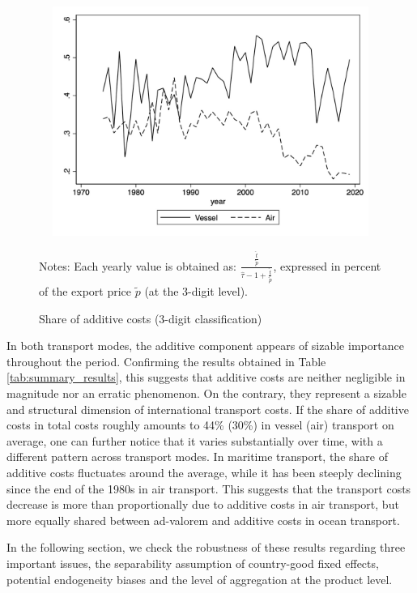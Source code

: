 \documentclass[a4paper,11pt]{article}
\begin{document}
\begin{figure}[htbp]
\caption{Share of additive costs (3-digit classification)}
\label{fig:part_cout_additif}
\begin{center}
 \includegraphics[width=12cm, height=7.5cm]{Figure1_share_of_additive_in_totalTC.jpg}
\begin{minipage} [c]  {5in} \scriptsize%
Notes: Each yearly value is obtained as: $\frac{\frac{\widehat{t}}{\widetilde{p}}}{\widehat{\tau}-1+\frac{\widehat{t}}{\widetilde{p}}}$, expressed in percent of the export price $\widetilde{p}$ (at the 3-digit level).
\end{minipage}
\end{center}
\end{figure}


In both transport modes, the additive component appears of sizable importance throughout the period.
Confirming the results obtained in Table \ref{tab:summary_results}, this suggests that additive costs are neither negligible in magnitude nor an erratic phenomenon.
On the contrary, they represent a sizable and structural dimension of international transport costs.
If the share of additive costs in total costs roughly amounts to 44\% (30\%) in vessel (air) transport on average, one can further notice that it varies substantially over time, with a different pattern across transport modes. In maritime transport, the share of additive costs fluctuates around the average, while it has been steeply declining since the end of the 1980s in air transport. This suggests that the transport costs decrease is more than proportionally due to additive costs in air transport, but more equally shared between ad-valorem and additive costs in ocean transport.\smallskip

In the following section, we check the robustness of these results regarding three important issues, the separability assumption of country-good fixed effects, potential endogeneity biases and the level of aggregation at the product level.
\end{document}
